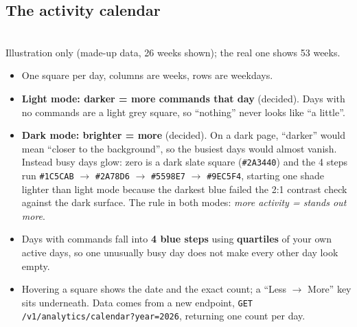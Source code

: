 \documentclass[11pt,a4paper]{article}
\begin{document}
\subsection{The activity calendar}
\begin{center}
\\[2pt]{\footnotesize Illustration only (made-up data, 26 weeks shown); the real one shows 53 weeks.}
\end{center}

\begin{itemize}[nosep]
  \item One square per day, columns are weeks, rows are weekdays.
  \item \textbf{Light mode: darker = more commands that day} (decided). Days with no commands are a
        light grey square, so ``nothing'' never looks like ``a little''.
  \item \textbf{Dark mode: brighter = more} (decided). On a dark page, ``darker'' would mean
        ``closer to the background'', so the busiest days would almost vanish. Instead busy days
        glow: zero is a dark slate square (\texttt{\#2A3440}) and the 4 steps run
        \texttt{\#1C5CAB} $\to$ \texttt{\#2A78D6} $\to$ \texttt{\#5598E7} $\to$ \texttt{\#9EC5F4},
        starting one shade lighter than light mode because the darkest blue failed the 2:1
        contrast check against the dark surface. The rule in both modes: \emph{more activity =
        stands out more}.
  \item Days with commands fall into \textbf{4 blue steps} using \textbf{quartiles} of your own
        active days, so one unusually busy day does not make every other day look empty.
  \item Hovering a square shows the date and the exact count; a ``Less $\to$ More'' key sits
        underneath. Data comes from a new endpoint, \texttt{GET /v1/analytics/calendar?year=2026},
        returning one count per day.
\end{itemize}
\end{document}
